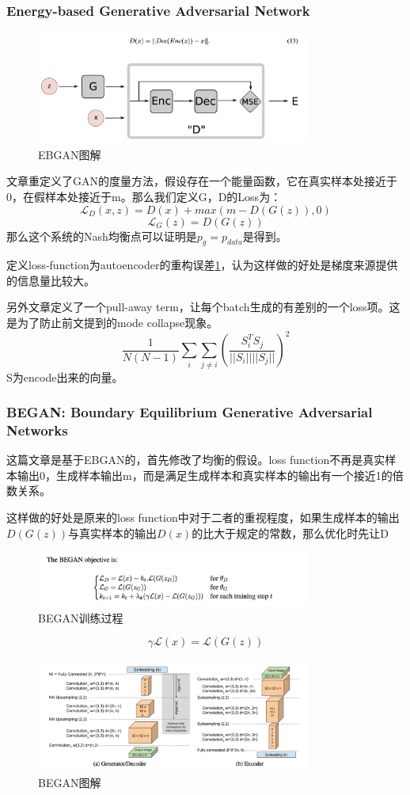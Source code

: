 \documentclass[a4paper]{article}
\begin{document}
\subsubsection{Energy-based Generative Adversarial Network\cite{DBLP:journals/corr/ZhaoML16}}
\begin{figure}[H]
\centering
\includegraphics[width=0.8\textwidth]{./img/34.png}
\caption{EBGAN图解}
\label{fig:34}
\end{figure}
文章重定义了GAN的度量方法，假设存在一个能量函数，它在真实样本处接近于0，在假样本处接近于m。那么我们定义G，D的Loss为：
$$\mathcal{L}_D(x,z) = D(x) + max(m - D(G(z)),0)$$
$$\mathcal{L}_G(z) = D(G(z))$$
那么这个系统的Nash均衡点可以证明是$p_g = p_{data}$是得到。

定义loss-function为autoencoder的重构误差\ref{fig:34}，认为这样做的好处是梯度来源提供的信息量比较大。

另外文章定义了一个pull-away term，让每个batch生成的有差别的一个loss项。这是为了防止前文提到的mode collapse现象。
$$\frac{1}{N(N-1)}\sum\limits_i\sum\limits_{j \neq i}(\frac{S_i^TS_j}{||S_i||||S_j||})^2$$
S为encode出来的向量。
\subsubsection{BEGAN: Boundary Equilibrium Generative Adversarial Networks\cite{DBLP:journals/corr/BerthelotSM17}}
这篇文章是基于EBGAN的，首先修改了均衡的假设。loss function不再是真实样本输出0，生成样本输出m，而是满足生成样本和真实样本的输出有一个接近1的倍数关系。

这样做的好处是原来的loss function中对于二者的重视程度，如果生成样本的输出$D(G(z))$与真实样本的输出$D(x)$的比大于规定的常数，那么优化时先让D
\begin{figure}[H]
\centering
\includegraphics[width=0.8\textwidth]{./img/35.png}
\caption{BEGAN训练过程}
\label{fig:35}
\end{figure}
$$\gamma \mathcal{L}(x)=\mathcal{L}(G(z))$$
\begin{figure}
\centering
\includegraphics[width=0.8\textwidth]{./img/36.png}
\caption{BEGAN图解}
\label{fig:36}
\end{figure}
\end{document}
